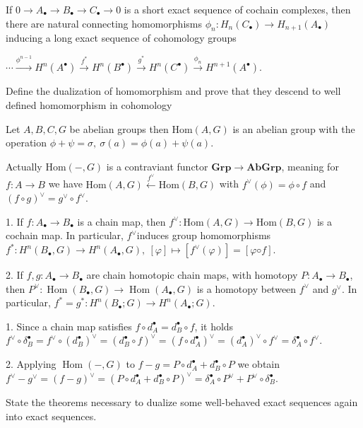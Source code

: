 If \( 0 \to A_\bullet \to B_\bullet \to C_\bullet \to 0 \) is a short exact sequence of cochain complexes, then there
are natural connecting homomorphisms \( \phi_n : H_n(C_\bullet) \to H_{n+1}(A_\bullet) \) inducing a long
exact sequence of cohomology groups

\( \cdots \xrightarrow{\phi^{n-1}} H^n(A^\bullet) \xrightarrow{f^\ast} H^n(B^\bullet) \xrightarrow{g^\ast} H^n(C^\bullet) \xrightarrow{\phi_n} H^{n+1}(A^\bullet) \).



Define the dualization of homomorphism and prove that they descend to well defined homomorphism in cohomology

Let \( A, B, C, G \) be abelian groups then \( \text{Hom}(A, G) \) is an abelian group 
with the operation \( \phi + \psi = \sigma,\ \sigma(a) = \phi(a) + \psi(a) \).

Actually \( \text{Hom}(-,G) \) is a contraviant functor \( \mathbf{Grp} \to \mathbf{AbGrp} \), meaning for \( f : A \to B \)
we have \( \text{Hom}(A, G) \xleftarrow{f^{\vee}} \text{Hom}(B, G) \) with \( f^\vee(\phi) = \phi \circ f \)
and \( (f \circ g)^\vee = g^\vee \circ f^\vee \).

1. If \( f : A_\bullet → B_\bullet \) is a chain map, then \( f^\vee : \text{Hom}(A, G) \to \text{Hom}(B, G) \) is a cochain map. 
In particular, \( f^\vee \)induces group homomorphisms
\( f^\ast : H^n(B_\bullet, G) \to H^n(A_\bullet, G),\ [φ] \mapsto [f^\vee(φ)] = [φ ◦ f ] \).

2. If \(f,g : A_\bullet \to B_\bullet\) are chain homotopic chain maps, with homotopy \(P : A_\bullet \to B_\bullet\), then
\(P^\vee : \operatorname{Hom} (B_\bullet, G) \to \operatorname{Hom} (A_\bullet, G)\)
is a homotopy between \(f^\vee\) and \(g^\vee\). In particular, \(f^* = g^* : H^n(B_\bullet; G) \to H^n(A_\bullet; G)\).

1. Since a chain map satisfies \(f \circ d_A^\bullet = d_B^\bullet \circ f\), it holds \(f^\vee \circ \delta_B^\bullet = f^\vee \circ (d_B^\bullet)^\vee = (d_B^\bullet \circ f)^\vee = (f \circ d_A^\bullet)^\vee = (d_A^\bullet)^\vee \circ f^\vee = \delta_A^\bullet \circ f^\vee\).

2. Applying \(\operatorname{Hom}(-, G)\) to \(f - g = P \circ d_A^\bullet + d_B^\bullet \circ P\) we obtain \(f^\vee - g^\vee = (f - g)^\vee = (P \circ d_A^\bullet + d_B^\bullet \circ P)^\vee = \delta_A^\bullet \circ P^\vee + P^\vee \circ \delta_B^\bullet\).


State the theorems necessary to dualize some well-behaved exact sequences again into exact sequences.

